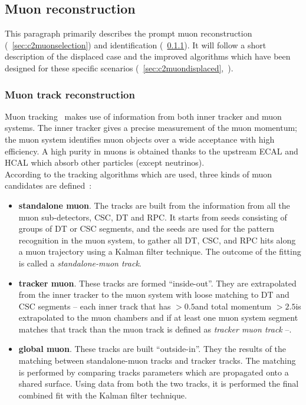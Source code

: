 \subsection{Muon reconstruction}\label{sec:trackmuon}
This paragraph primarily describes the prompt muon reconstruction (~\ref{sec:c2muonselection}) and
identification (~\ref{sec:c2muonreco}). It will follow a short description of the displaced
case and the improved algorithms which have been designed for these specific
scenarios (~\ref{sec:c2muondisplaced},~\cite{CMS-DP-2015-015}).

\subsubsection{Muon track reconstruction}\label{sec:c2muonreco}
Muon tracking~\cite{collaboration_2013,Sirunyan_2018_muon} makes use of information from
both inner tracker and muon systems. The
inner tracker gives a precise measurement of the muon momentum; the
muon system identifies muon objects over a wide acceptance with high efficiency. A high purity in muons is obtained
thanks to the upstream ECAL and HCAL which absorb other particles
(except neutrinos). \\
According to the tracking algorithms which are used, three kinds of muon
candidates are defined~\cite{Sirunyan_2018_muon}:
\begin{itemize}
\setlength\itemsep{-0.2em}
\item \textbf{standalone muon}. The tracks are built from the
  information from all the muon sub-detectors, CSC, DT and RPC. It
  starts from seeds consisting of groups of DT or CSC segments, and
  the seeds are used for the pattern recognition in the muon system, to
gather all DT, CSC, and RPC hits along a muon trajectory using a
Kalman filter technique. The outcome of the fitting is called a
\emph{standalone-muon track}.
\item \textbf{tracker muon}. These tracks are formed
  ``inside-out''. They are extrapolated from the inner
  tracker to the muon system with loose matching to DT and CSC
  segments -- each inner track that has \pt$>0.5$\GeV and total
  momentum $>2.5$\GeV is extrapolated to the muon chambers and if at
  least one muon system segment matches that track than the muon track is defined as \emph{tracker
  muon track} --. 
\item \textbf{global muon}. These tracks are built
  ``outside-in''. They the results of the matching between
  standalone-muon tracks and tracker tracks. The matching is performed by
  comparing tracks parameters which are propagated onto a shared
  surface. Using data from both the two tracks, it is performed the final combined fit with the Kalman filter technique.
\end{itemize}

